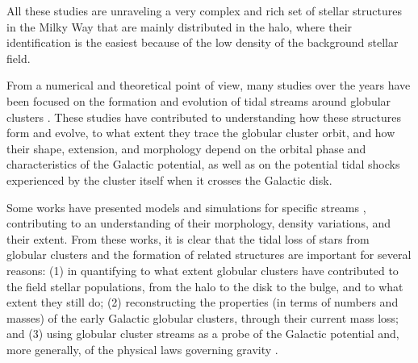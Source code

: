 All these studies are unraveling  a very complex and rich set of stellar structures in the Milky Way that are mainly distributed in the halo, where their identification is the easiest because of the low density of the background stellar field. 

From a numerical and theoretical point of view, many studies over the years have been focused on the formation and evolution of tidal streams around globular clusters \citep{1975AJ.....80..290K, 1992ApJ...386..506O, 1992ApJ...386..519O, 1998ASPC..136...45G, 1999A&A...352..149C, 2002MNRAS.332..915I, 2002ApJ...570..656J, 2002JKAS...35...75Y, 2005AJ....129.1906C, 2005CeMDA..91...59D, 2007ApJ...659.1212M, 2008ApJ...681...40S, 2010MNRAS.401..105K, 2010MNRAS.406.2732L, 2012MNRAS.420.2700K, 2012A&A...546L...7M, 2013MNRAS.433.1813S,  2014ApJ...795...95B, 2016MNRAS.463L..17A, 2016MNRAS.463..102E, 2016MNRAS.457.3817S, 2017NatAs...1..633P, 2018ApJ...861...69C,  2018A&A...609A..44T, 2020ApJ...889..107C, 2022A&A...667A.112V}. These studies have contributed to understanding how these structures form and evolve, to what extent they trace the globular cluster orbit, and how their shape, extension, and morphology depend on the orbital phase and characteristics of the Galactic potential, as well as  on the potential tidal shocks experienced by the cluster itself when it crosses the Galactic disk.

Some works have presented models and simulations for specific streams \citep{2004AJ....127.2753D, 2012A&A...546L...7M, 2019MNRAS.484.2009B, 2019ApJ...880...38B, 2021JCAP...10..043B, 2021DDA....5240106B}, contributing to an understanding of their morphology, density variations, and their extent. From these works, it is clear that the tidal loss of stars from globular clusters and the formation of related structures are important for several reasons: (1) in quantifying to what extent globular clusters have contributed to the field stellar populations, from the halo to the disk to the bulge, and to what extent they still do; (2) reconstructing the properties (in terms of numbers and masses) of the early Galactic globular clusters, through their current mass loss; and (3) using globular cluster streams as a probe of the Galactic potential and, more generally, of the physical laws governing gravity \citep[see, e.g., ][]{2018A&A...609A..44T, 2019ApJ...887L..12B, 2020PhRvD.102h4066N, 2021JCAP...10..043B}.

